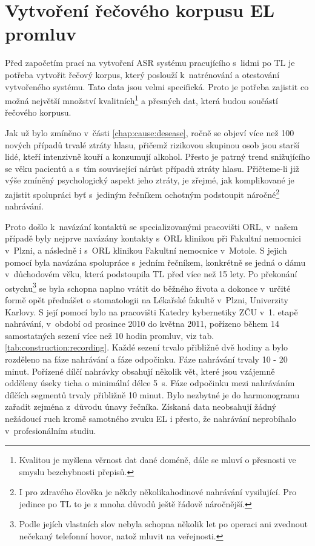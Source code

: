 \section{Vytvoření řečového korpusu EL promluv}
\label{chap:construction:corpus}

Před započetím prací na vytvoření ASR systému pracujícího s~lidmi po TL je potřeba vytvořit řečový korpus, který poslouží  k~natrénování a otestování vytvořeného systému. Tato data jsou velmi specifická. Proto je potřeba zajistit co možná největší množství kvalitních\footnote{Kvalitou je myšlena věrnost dat dané doméně, dále se mluví o přesnosti ve smyslu bezchybnosti přepisů.} a přesných dat, která budou součástí řečového korpusu.

Jak už bylo zmíněno v~části \ref{chap:cause:desease}, ročně se objeví více než 100 nových případů trvalé ztráty hlasu, přičemž rizikovou skupinou osob jsou starší lidé, kteří intenzivně kouří a konzumují alkohol. Přesto je patrný trend snižujícího se věku pacientů a s~tím související nárůst případů ztráty hlasu. Přičteme-li již výše zmíněný psychologický aspekt jeho ztráty, je zřejmé, jak komplikované je zajistit spolupráci byť s~jediným řečníkem ochotným podstoupit náročné\footnote{I pro zdravého člověka je někdy několikahodinové nahrávání vysilující. Pro jedince po TL to je z mnoha důvodů ještě řádově náročnější.} nahrávání.

Proto došlo  k~navázání kontaktů se specializovanými pracovišti ORL, v~našem případě byly nejprve navázány kontakty s~ORL klinikou při Fakultní nemocnici v~Plzni, a následně i s~ORL klinikou Fakultní nemocnice v~Motole.
S jejich pomocí byla navázána spolupráce s~jedním řečníkem, konkrétně se jedná o dámu v~důchodovém věku, která podstoupila TL před více než 15 lety.
Po překonání ostychu\footnote{Podle jejích vlastních slov nebyla schopna několik let po operaci ani zvednout nečekaný telefonní hovor, natož mluvit na veřejnosti.} se byla schopna naplno vrátit do běžného života a dokonce v~určité formě opět přednášet o stomatologii na Lékařské fakultě v~Plzni, Univerzity Karlovy.
S její pomocí bylo na pracovišti Katedry kybernetiky ZČU v~1. etapě nahrávání, v~období od prosince 2010 do května 2011, pořízeno během 14 samostatných sezení více než 10 hodin promluv, viz tab. \ref{tab:construction:recording}.
Každé sezení trvalo přibližně dvě hodiny a bylo rozděleno na fáze nahrávání a fáze odpočinku. Fáze nahrávání trvaly 10 - 20 minut.
Pořízené dílčí nahrávky obsahují několik vět, které jsou vzájemně odděleny úseky ticha o minimální délce 5~s. Fáze odpočinku mezi nahráváním dílčích segmentů trvaly přibližně 10 minut.
Bylo nezbytné je do harmonogramu zařadit zejména z~důvodu únavy řečníka.
Získaná data neobsahují žádný nežádoucí ruch kromě samotného zvuku EL i přesto, že nahrávání neprobíhalo v~profesionálním studiu.


